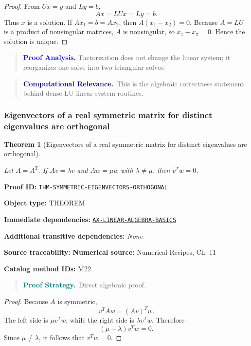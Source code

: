 \documentclass[10pt]{article}
\newcommand{\pidraw}[1]{\begingroup\urlstyle{tt}\nolinkurl{#1}\endgroup}
\newcommand{\pidref}[1]{\hyperref[prf:#1]{\pidraw{#1}}}
\newtheorem{theorem}{Theorem}[section]
\theoremstyle{definition}
\theoremstyle{remark}
\newenvironment{proofstrategy}
{\begin{quote}\small\noindent\textbf{\textcolor{teal}{Proof Strategy.}}\ }
{\end{quote}}
\newenvironment{proofanalysis}
{\begin{quote}\small\noindent\textbf{\textcolor{blue}{Proof Analysis.}}\ }
{\end{quote}}
\newenvironment{computationalrelevance}
{\begin{quote}\small\noindent\textbf{\textcolor{navy}{Computational Relevance.}}\ }
{\end{quote}}
\newcommand{\meta}[2]{\noindent\textbf{#1:} #2\par}
\begin{document}
\begin{proof}

From $Ux=y$ and $Ly=b$,
\[
Ax=LUx=Ly=b.
\]
Thus $x$ is a solution. If $Ax_1=b=Ax_2$, then
$A(x_1-x_2)=0$. Because $A=LU$ is a product of nonsingular matrices, $A$ is
nonsingular, so $x_1-x_2=0$. Hence the solution is unique.

\end{proof}

\begin{proofanalysis}Factorization does not change the linear system; it reorganizes one solve into two triangular solves.\end{proofanalysis}

\begin{computationalrelevance}This is the algebraic correctness statement behind dense LU linear-system routines.\end{computationalrelevance}

\subsubsection{Eigenvectors of a real symmetric matrix for distinct eigenvalues are orthogonal}

\begin{theorem}[Eigenvectors of a real symmetric matrix for distinct eigenvalues are orthogonal]\label{prf:THM-SYMMETRIC-EIGENVECTORS-ORTHOGONAL}

Let $A=A^T$. If $Av=\lambda v$ and $Aw=\mu w$ with $\lambda\ne\mu$, then $v^Tw=0$.

\end{theorem}

\meta{Proof ID}{\pidraw{THM-SYMMETRIC-EIGENVECTORS-ORTHOGONAL}}
\meta{Object type}{THEOREM}
\meta{Immediate dependencies}{\pidref{AX-LINEAR-ALGEBRA-BASICS}}
\meta{Additional transitive dependencies}{\emph{None}}
\meta{Source traceability}{\textbf{Numerical source:} Numerical Recipes, Ch. 11}
\meta{Catalog method IDs}{M22}

\begin{proofstrategy}Direct algebraic proof.\end{proofstrategy}

\begin{proof}

Because $A$ is symmetric,
\[
v^TAw=(A v)^Tw.
\]
The left side is $\mu v^Tw$, while the right side is
$\lambda v^Tw$. Therefore
\[
(\mu-\lambda)v^Tw=0.
\]
Since $\mu\ne\lambda$, it follows that $v^Tw=0$.

\end{proof}
\end{document}
